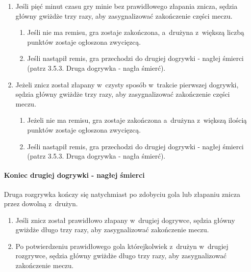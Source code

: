 \documentclass[12pt,a4paper]{article}
\begin{document}
\begin{enumerate}
	\item Jeśli pięć minut czasu gry minie bez prawidłowego złapania znicza,
	      sędzia główny gwiżdże trzy razy, aby zasygnalizować zakończenie części
	      meczu.
	      \begin{enumerate}
		      \item Jeśli nie ma remisu, gra zostaje zakończona, a~drużyna z~większą
		            liczbą punktów zostaje ogłoszona zwycięzcą.

		      \item Jeśli nastąpił remis, gra przechodzi do drugiej dogrywki - nagłej
		            śmierci (patrz 3.5.3. Druga dogrywka - nagła śmierć).
	      \end{enumerate}

	\item Jeżeli znicz został złapany w~czysty sposób w~trakcie pierwszej
	      dogrywki, sędzia główny gwiżdże trzy razy, aby zasygnalizować
	      zakończenie części meczu.
	      \begin{enumerate}
		      \item Jeżeli nie ma remisu, gra zostaje zakończona a~drużyna z~większą
		            ilością punktów zostaje
		            ogłoszona zwycięzcą.

		      \item Jeśli nastąpił remis, gra przechodzi do drugiej dogrywki - nagłej
		            śmierci (patrz 3.5.3. Druga dogrywka - nagła śmierć).
	      \end{enumerate}
\end{enumerate}

\paragraph{Koniec drugiej dogrywki - nagłej śmierci}
Druga
rozgrywka kończy się natychmiast po zdobyciu gola lub złapaniu znicza
przez dowolną z~drużyn.

\begin{enumerate}
	\item Jeśli znicz został prawidłowo złapany w~drugiej dogrywce, sędzia
	      główny gwiżdże długo trzy razy, aby zasygnalizować zakończenie meczu.

	\item Po potwierdzeniu prawidłowego gola którejkolwiek z~drużyn w~drugiej
	      rozgrywce, sędzia główny gwiżdże długo trzy razy, aby zasygnalizować
	      zakończenie meczu.
\end{enumerate}
\end{document}

